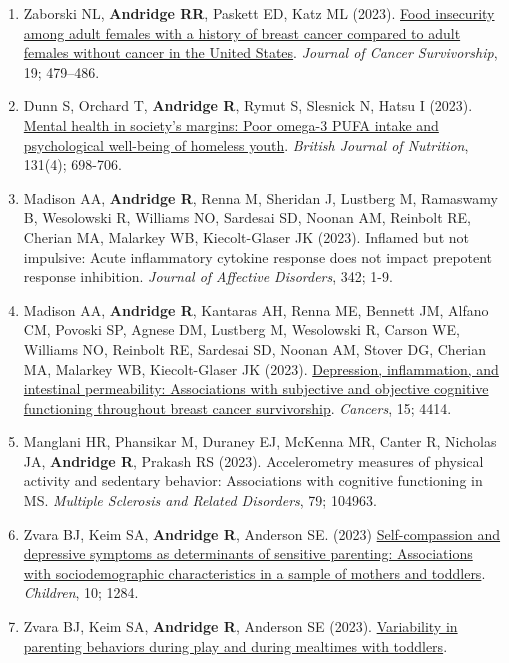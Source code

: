 \documentclass[
  english,
  letterpaper,
  DIV=11,
  numbers=noendperiod]{scrartcl}
\begin{document}
\begin{enumerate}
{  Mental Health}, 28(2), 330-343.
\item
  Zaborski NL, \textbf{Andridge RR}, Paskett ED, Katz ML (2023).
  \href{https://doi.org/10.1007/s11764-023-01481-3}{Food insecurity
  among adult females with a history of breast cancer compared to adult
  females without cancer in the United States}. \emph{Journal of Cancer
  Survivorship}, 19; 479--486.
\item
  Dunn S, Orchard T, \textbf{Andridge R}, Rymut S, Slesnick N, Hatsu I
  (2023). \href{https://doi.org/10.1017/S000711452300212X}{Mental health
  in society's margins: Poor omega-3 PUFA intake and psychological
  well-being of homeless youth}. \emph{British Journal of Nutrition},
  131(4); 698-706.
\item
  Madison AA, \textbf{Andridge R}, Renna M, Sheridan J, Lustberg M,
  Ramaswamy B, Wesolowski R, Williams NO, Sardesai SD, Noonan AM,
  Reinbolt RE, Cherian MA, Malarkey WB, Kiecolt-Glaser JK (2023).
  Inflamed but not impulsive: Acute inflammatory cytokine response does
  not impact prepotent response inhibition. \emph{Journal of Affective
  Disorders}, 342; 1-9.
\item
  Madison AA, \textbf{Andridge R}, Kantaras AH, Renna ME, Bennett JM,
  Alfano CM, Povoski SP, Agnese DM, Lustberg M, Wesolowski R, Carson WE,
  Williams NO, Reinbolt RE, Sardesai SD, Noonan AM, Stover DG, Cherian
  MA, Malarkey WB, Kiecolt-Glaser JK (2023).
  \href{https://doi.org/10.3390/cancers15174414}{Depression,
  inflammation, and intestinal permeability: Associations with
  subjective and objective cognitive functioning throughout breast
  cancer survivorship}. \emph{Cancers}, 15; 4414.
\item
  Manglani HR, Phansikar M, Duraney EJ, McKenna MR, Canter R, Nicholas
  JA, \textbf{Andridge R}, Prakash RS (2023). Accelerometry measures of
  physical activity and sedentary behavior: Associations with cognitive
  functioning in MS. \emph{Multiple Sclerosis and Related Disorders},
  79; 104963.
\item
  Zvara BJ, Keim SA, \textbf{Andridge R}, Anderson SE. (2023)
  \href{https://doi.org/10.3390/children10081284}{Self-compassion and
  depressive symptoms as determinants of sensitive parenting:
  Associations with sociodemographic characteristics in a sample of
  mothers and toddlers}. \emph{Children}, 10; 1284.
\item
  Zvara BJ, Keim SA, \textbf{Andridge R}, Anderson SE (2023).
  \href{https://doi.org/10.1002/icd.2447}{Variability in parenting
  behaviors during play and during mealtimes with toddlers}.

\end{enumerate}
\end{document}
